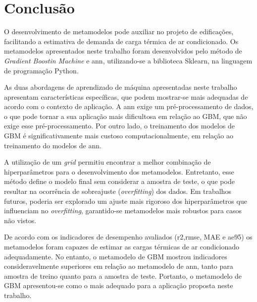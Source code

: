 \documentclass{article}
\begin{document}
\section{Conclusão}

O desenvolvimento de metamodelos pode auxiliar no projeto de edificações, facilitando a estimativa de demanda de carga térmica de ar condicionado. 
Os metamodelos apresentados neste trabalho foram desenvolvidos pelo método de \textit{Gradient Boostin Machine} e \acrlong{ann}, utilizando-se a biblioteca Sklearn, na linguagem de programação Python.

As duas abordagens de aprendizado de máquina apresentadas neste trabalho apresentam características específicas, que podem mostrar-se mais adequadas de acordo com o contexto de aplicação. A \acrshort{ann} exige um pré-processamento de dados, o que pode tornar a sua aplicação mais dificultosa em relação ao GBM, que não exige esse pré-processamento. Por outro lado, o treinamento dos modelos de GBM é significativamente mais custoso computacionalmente, em relação ao treinamento do modelos de \acrshort{ann}.

A utilização de um \textit{grid} permitiu encontrar a melhor combinação de hiperparâmetros para o desenvolvimento dos metamodelos.
Entretanto, esse método define o modelo final sem considerar a amostra de teste, o que pode resultar na ocorrência de sobreajuste (\textit{overfitting}) dos dados.
Em trabalhos futuros, poderia ser explorado um ajuste mais rigoroso dos hiperparâmetros que influenciam no \textit{overfitting}, garantido-se metamodelos mais robustos para casos não vistos.

De acordo com os indicadores de desempenho avaliados (\acrshort{r2},\acrshort{rmse}, MAE e \acrshort{ae95}) os metamodelos foram capazes de estimar as cargas térmicas de ar condicionado adequadamente.
No entanto, o metamodelo de GBM mostrou indicadores consideravelmente superiores em relação ao metamodelo de \acrshort{ann}, tanto para amostra de treino quanto para a amostra de teste.
Portanto, o metamodelo de GBM apresentou-se como o mais adequado para a aplicação proposta neste trabalho.


\end{document}
